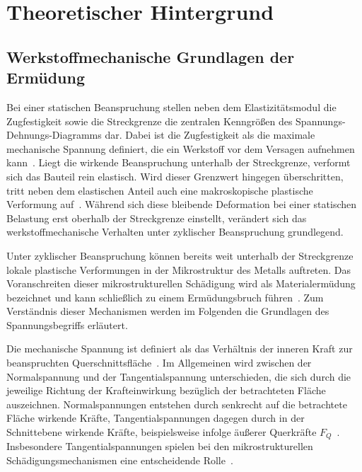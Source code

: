 \chapter{Theoretischer Hintergrund}

	\section{Werkstoffmechanische Grundlagen der Ermüdung}

Bei einer statischen Beanspruchung stellen neben dem Elastizitätsmodul die Zugfestigkeit sowie die Streckgrenze die zentralen Kenngrößen des Spannungs-Dehnungs-Diagramms dar. Dabei ist die Zugfestigkeit als die maximale mechanische Spannung definiert, die ein Werkstoff vor dem Versagen aufnehmen kann~\cite[Seite~117]{HibbelerTechnischeMechanik2013}. Liegt die wirkende Beanspruchung unterhalb der Streckgrenze, verformt sich das Bauteil rein elastisch. Wird dieser Grenzwert hingegen überschritten, tritt neben dem elastischen Anteil auch eine makroskopische plastische Verformung auf~\cite[Seite~8]{Laepple2016}. Während sich diese bleibende Deformation bei einer statischen Belastung erst oberhalb der Streckgrenze einstellt, verändert sich das werkstoffmechanische Verhalten unter zyklischer Beanspruchung grundlegend.

Unter zyklischer Beanspruchung können bereits weit unterhalb der Streckgrenze lokale plastische Verformungen in der Mikrostruktur des Metalls auftreten. Das Voranschreiten dieser mikrostrukturellen Schädigung wird als Materialermüdung bezeichnet und kann schließlich zu einem Ermüdungsbruch führen~\cite[Seite~1--5]{Ermüdungsfestigkeit2007}. Zum Verständnis dieser Mechanismen werden im Folgenden die Grundlagen des Spannungsbegriffs erläutert.

Die mechanische Spannung ist definiert als das Verhältnis der inneren Kraft zur beanspruchten Querschnittsfläche~\cite[Seite 9--10]{Balke2008}. Im Allgemeinen wird zwischen der Normalspannung und der Tangentialspannung unterschieden, die sich durch die jeweilige Richtung der Krafteinwirkung bezüglich der betrachteten Fläche auszeichnen. Normalspannungen entstehen durch senkrecht auf die betrachtete Fläche wirkende Kräfte, Tangentialspannungen dagegen durch in der Schnittebene wirkende Kräfte, beispielsweise infolge äußerer Querkräfte $F_Q$~\cite[Seite~206]{KabusFestigkeitslehre2023}. Insbesondere Tangentialspannungen spielen bei den mikrostrukturellen Schädigungsmechanismen eine entscheidende Rolle~\cite[Seite~265]{Werkstofftechnik-Praktikum2021}.

